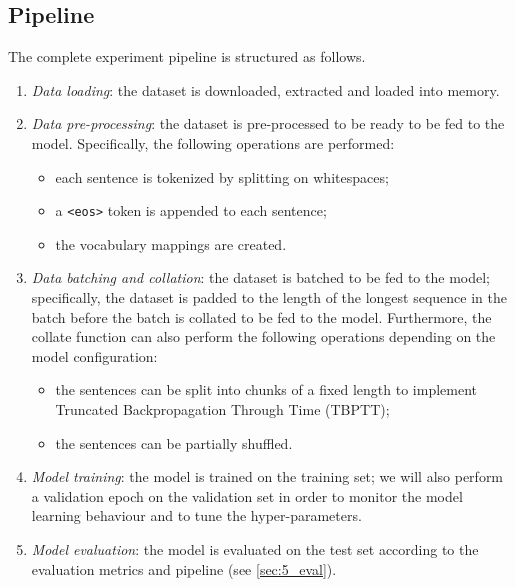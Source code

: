 \subsection{Pipeline}
The complete experiment pipeline is structured as follows.
\begin{enumerate}
    \item \emph{Data loading}: the dataset is downloaded, extracted and loaded into memory.
    \item \emph{Data pre-processing}: the dataset is pre-processed to be ready to be fed to the model. Specifically, the following operations are performed:
    \begin{itemize} 
        \item each sentence is tokenized by splitting on whitespaces;
        \item a \texttt{<eos>} token is appended to each sentence;
        \item the vocabulary mappings are created.
    \end{itemize}
    \item \emph{Data batching and  collation}: the dataset is batched to be fed to the model; specifically, the dataset is padded to the length of the longest sequence in the batch before the batch is collated to be fed to the model. Furthermore, the collate function can also perform the following operations depending on the model configuration:
    \begin{itemize}
        \item the sentences can be split into chunks of a fixed length to implement Truncated Backpropagation Through Time (TBPTT);
        \item the sentences can be partially shuffled.
    \end{itemize}
    \item \emph{Model training}: the model is trained on the training set; we will also perform a validation epoch on the validation set in order to monitor the model learning behaviour and to tune the hyper-parameters.
    \item \emph{Model evaluation}: the model is evaluated on the test set according to the evaluation metrics and pipeline (see \ref{sec:5_eval}).
\end{enumerate}

